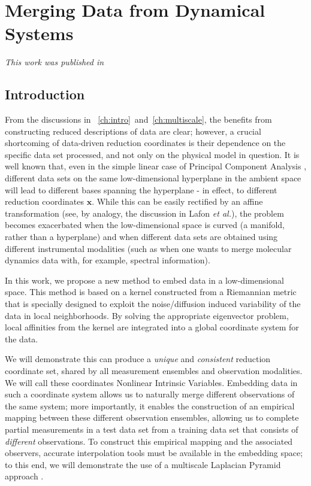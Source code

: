 
\chapter{Merging Data from Dynamical Systems \label{ch:merging}}

\graphicspath{{ch-merging/figures/}}

{\em This work was published in \citep{dsilva2013nonlinear}}

\section{Introduction}

From the discussions in \chap~\ref{ch:intro}~and~\ref{ch:multiscale}, the benefits from constructing reduced descriptions of data are clear; however, a crucial shortcoming of
 data-driven reduction coordinates is their dependence on the specific data set processed,
and not only on the physical model in question.
%
It is well known that, even in the simple linear case of Principal Component Analysis \cite{jolliffe2005principal},
different data sets on the same low-dimensional hyperplane in the ambient space
will lead to different bases spanning the hyperplane - in effect, to different reduction coordinates $\mathbf{x}$.
%
While this can be easily rectified by an affine transformation
(see, by analogy, the discussion in Lafon {\em et al.}\cite{lafon2006data}),
the problem becomes
exacerbated when the low-dimensional space is curved (a manifold, rather than a hyperplane)
and when different data sets are obtained using different instrumental modalities
(such as when one wants to merge molecular dynamics data with, for example, spectral information).
%

In this work, we propose a new method to embed data in a low-dimensional space.
%
This method is based on a kernel constructed from a Riemannian metric that is specially designed to exploit the noise/diffusion induced variability of the data in local neighborhoods.
%
By solving the appropriate eigenvector problem, local affinities from the kernel are integrated into a global coordinate system for the data.

We will demonstrate this can produce a {\em unique} and {\em consistent} reduction
coordinate set, shared by all measurement ensembles and observation modalities.
%
We will call these coordinates Nonlinear Intrinsic Variables.
%
Embedding data in such a coordinate system allows us to naturally merge different observations of the same system;
more importantly, it enables the construction of an empirical mapping between these different
observation ensembles, allowing us to complete partial measurements in a test data set from a training data set
that consists of {\em different} observations.
%
To construct this empirical mapping and the associated observers,
accurate interpolation tools must be available in the embedding space; to this
end, we will demonstrate the use of a multiscale Laplacian Pyramid approach \cite{rabin2012heterogeneous}.


